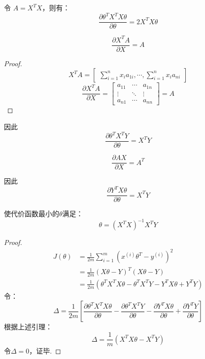 \documentclass[cn,hazy,blue,normal,14pt]{elegantnote}
\begin{document}
\noindent 令 $A=X^TX$，则有：
$$
\frac{\partial \theta^TX^TX\theta}{\partial \theta}=2X^TX\theta
$$
\begin{lemma}
$$
\frac{\partial X^TA}{\partial X}=A
$$
\end{lemma}
\begin{proof}
$$
X^TA=\begin{bmatrix}
    \sum\limits_{i=1}^{n} x_i a_{1i},\cdots,\sum\limits_{i=1}^{n}x_i a_{ni}
\end{bmatrix}
$$
$$
\frac{\partial X^TA}{\partial X}=\begin{bmatrix}
    a_{11} &\cdots & a_{1n} \\
    \vdots &\ddots & \vdots \\
    a_{n1} &\cdots & a_{nn} 
\end{bmatrix}=A
$$
\end{proof}
\noindent 因此
$$
\frac{\partial \theta^TX^TY}{\partial \theta}=X^TY
$$
\begin{lemma}
$$
\frac{\partial AX}{\partial X}=A^T
$$
\end{lemma}
\noindent 因此
$$
\frac{\partial Y^TX\theta}{\partial \theta}=X^TY
$$
\begin{theorem}
使代价函数最小的$\theta$满足：
$$
\theta=(X^TX)^{-1}X^TY
$$
\end{theorem}
\begin{proof}
$$
\begin{aligned}
  J(\theta)&=\frac{1}{2m}\sum_{i=1}^{m}(x^{(i)}\theta^T-y^{(i)})^2  \\
  &=\frac{1}{2m}(X\theta-Y)^T(X\theta-Y) \\
  &=\frac{1}{2m}(\theta^TX^TX\theta-\theta^TX^TY-Y^TX\theta+Y^TY)
\end{aligned}
$$
\noindent 令：
$$
\Delta=\frac{1}{2m}[\frac{\partial \theta^TX^TX\theta}{\partial \theta}-\frac{\partial \theta^TX^TY}{\partial \theta}-\frac{\partial Y^TX\theta}{\partial \theta}+\frac{\partial Y^TY}{\partial \theta}]
$$
\noindent 根据上述引理：
$$
\Delta=\frac{1}{m}(X^TX\theta-X^TY)
$$
令$\Delta=0$，证毕.
\end{proof}
\end{document}
